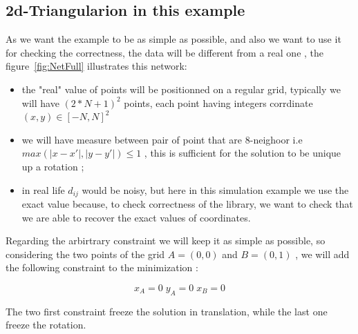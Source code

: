 \subsection{2d-Triangularion in this example}

As we want the example to be as simple as possible, and also we want to use it for checking
the correctness, the data will be different from a real one , the figure~\ref{fig:NetFull} illustrates 
this network:

\begin{itemize}
    \item the "real" value of points will be positionned on a regular grid, typically we
           will have $(2*N+1)^2$ points, each point having integers corrdinate 
           $(x,y) \in [-N,N]^2$

    \item we will have measure between pair of point that  are $8$-neighoor i.e
          $max(|x-x'|,|y-y'|)\leq 1 $ , this is sufficient for the solution to be unique
          up a rotation ;

    \item in real life  $d_{ij}$ would be noisy, but here in this simulation example we
          use the exact value because, to check correctness of the library, we want to check 
          that we are able to recover the exact values of coordinates.
\end{itemize}

Regarding the arbirtrary constraint we will keep it as simple as possible, so 
considering the two points of the grid  $A=(0,0)$ and $B=(0,1)$ , we will add the following
constraint to the minimization :

\begin{equation}
      x_A=0  \;  y_A=0  \;  x_B=0 \label{Eq:FixVarAB}
\end{equation}

The two first constraint freeze the solution in translation, while the last one freeze the rotation.


